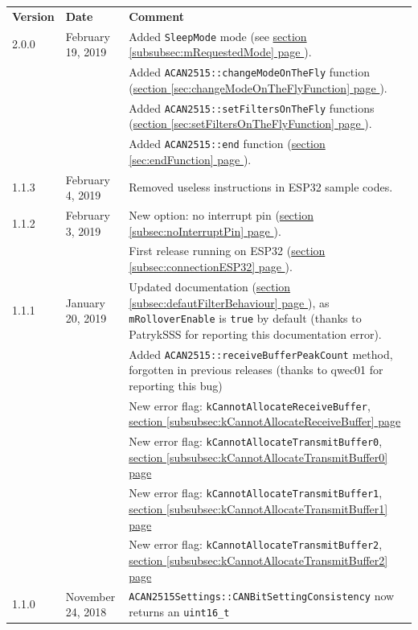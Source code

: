 \documentclass[10pt, a4paper, obeyspaces]{extarticle}
\newcommand\refSectionPage[1]{\hyperref[sec:#1]{section \ref*{sec:#1} page \pageref{sec:#1}}}
\newcommand\refSubsectionPage[1]{\hyperref[subsec:#1]{section \ref*{subsec:#1} page \pageref{subsec:#1}}}
\newcommand\refSubsubsectionPage[1]{\hyperref[subsubsec:#1]{section \ref*{subsubsec:#1} page \pageref{subsubsec:#1}}}
\begin{document}
\begin{center}
  \small
  \begin{tabular}{llp{11cm}}
    \textbf{Version} & \textbf{Date} & \textbf{Comment}\\
    2.0.0 & February 19, 2019 & Added \texttt{SleepMode} mode (see \refSubsubsectionPage{mRequestedMode}). \\
          &                   & Added \texttt{ACAN2515::changeModeOnTheFly} function (\refSectionPage{changeModeOnTheFlyFunction}). \\
          &                   & Added \texttt{ACAN2515::setFiltersOnTheFly} functions (\refSectionPage{setFiltersOnTheFlyFunction}). \\
          &                   & Added \texttt{ACAN2515::end} function (\refSectionPage{endFunction}). \\
    1.1.3 & February 4, 2019 & Removed useless instructions in ESP32 sample codes. \\
    1.1.2 & February 3, 2019 & New option: no interrupt pin (\refSubsectionPage{noInterruptPin}). \\
          &                  & First release running on ESP32 (\refSubsectionPage{connectionESP32}). \\
    1.1.1 & January 20, 2019 & Updated documentation (\refSubsectionPage{defautFilterBehaviour}), as \texttt{mRolloverEnable} is \texttt{true} by default (thanks to PatrykSSS for reporting this documentation error).\\
          &                   & Added \texttt{ACAN2515::receiveBufferPeakCount} method, forgotten in previous releases (thanks to qwec01 for reporting this bug)\\
          &                   & New error flag: \texttt{kCannotAllocateReceiveBuffer}, \refSubsubsectionPage{kCannotAllocateReceiveBuffer}\\
          &                   & New error flag: \texttt{kCannotAllocateTransmitBuffer0}, \refSubsubsectionPage{kCannotAllocateTransmitBuffer0}\\
          &                   & New error flag: \texttt{kCannotAllocateTransmitBuffer1}, \refSubsubsectionPage{kCannotAllocateTransmitBuffer1}\\
          &                   & New error flag: \texttt{kCannotAllocateTransmitBuffer2}, \refSubsubsectionPage{kCannotAllocateTransmitBuffer2}\\
    1.1.0 & November 24, 2018 & \texttt{ACAN2515Settings::CANBitSettingConsistency} now returns an \texttt{uint16\_t} \\

\end{tabular}
\end{center}
\end{document}

